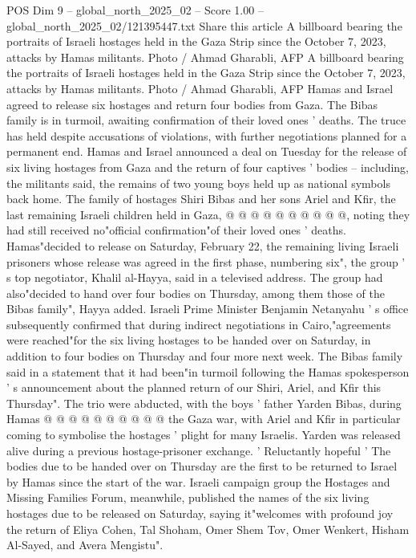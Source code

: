 \begin{textsample}{POS Dim 9 – global\_north\_2025\_02 – Score 1.00 – global\_north\_2025\_02/121395447.txt}  \label{ex:f9_pos_438}
Share this article A billboard bearing the portraits of Israeli hostages held in the Gaza Strip since the October 7, 2023, attacks by Hamas militants.
Photo / Ahmad Gharabli, AFP A billboard bearing the portraits of Israeli hostages held in the Gaza Strip since the October 7, 2023, attacks by Hamas militants.
Photo / Ahmad Gharabli, AFP Hamas and Israel agreed to release six hostages and return four bodies from Gaza.
The Bibas family is in turmoil, awaiting confirmation of their loved ones ' deaths.
The truce has held despite accusations of violations, with further negotiations planned for a permanent end.
Hamas and Israel announced a deal on Tuesday for the release of six living hostages from Gaza and the return of four captives ' bodies -- including, the militants said, the remains of two young boys held up as national symbols back home.
The family of hostages Shiri Bibas and her sons Ariel and Kfir, the last remaining Israeli children held in Gaza, @ @ @ @ @ @ @ @ @ @, noting they had still received no"official confirmation"of their loved ones ' deaths.
Hamas"decided to release on Saturday, February 22, the remaining living Israeli prisoners whose release was agreed in the first phase, numbering six", the group ' s top negotiator, Khalil al-Hayya, said in a televised address.
The group had also"decided to hand over four bodies on Thursday, among them those of the Bibas family", Hayya added.
Israeli Prime Minister Benjamin Netanyahu ' s office subsequently confirmed that during indirect negotiations in Cairo,"agreements were reached"for the six living hostages to be handed over on Saturday, in addition to four bodies on Thursday and four more next week.
The Bibas family said in a statement that it had been"in turmoil following the Hamas spokesperson ' s announcement about the planned return of our Shiri, Ariel, and Kfir this Thursday".
The trio were abducted, with the boys ' father Yarden Bibas, during Hamas @ @ @ @ @ @ @ @ @ @ the Gaza war, with Ariel and Kfir in particular coming to symbolise the hostages ' plight for many Israelis.
Yarden was released alive during a previous hostage-prisoner exchange. ' Reluctantly hopeful ' The bodies due to be handed over on Thursday are the first to be returned to Israel by Hamas since the start of the war.
Israeli campaign group the Hostages and Missing Families Forum, meanwhile, published the names of the six living hostages due to be released on Saturday, saying it"welcomes with profound joy the return of Eliya Cohen, Tal Shoham, Omer Shem Tov, Omer Wenkert, Hisham Al-Sayed, and Avera Mengistu".

\end{textsample}
